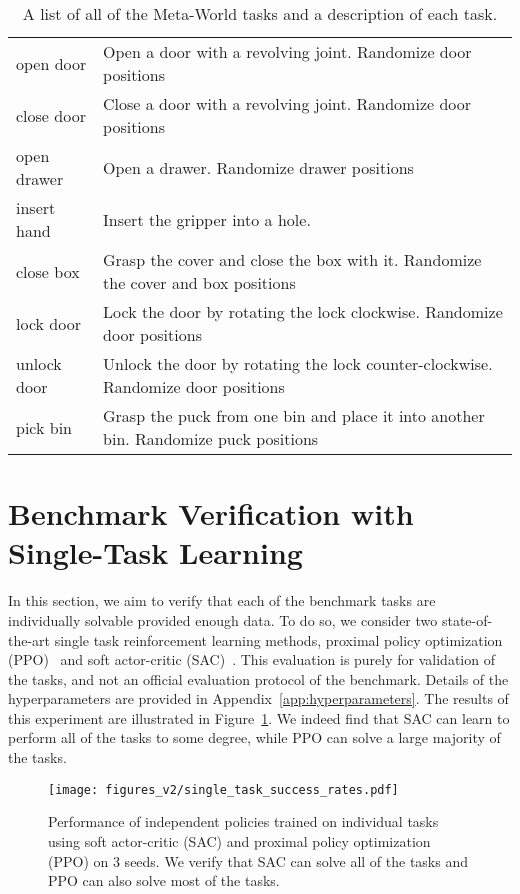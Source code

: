 \begin{table}[h]
\begin{tabular}{ll}
open door & Open a door with a revolving joint. Randomize door positions\\
close door & Close a door with a revolving joint. Randomize door positions\\
open drawer & Open a drawer. Randomize drawer positions\\
insert hand & Insert the gripper into a hole.\\
close box & Grasp the cover and close the box with it. Randomize the cover and box positions\\
lock door & Lock the door by rotating the lock clockwise. Randomize door positions\\
unlock door & Unlock the door by rotating the lock counter-clockwise. Randomize door positions\\
pick bin & Grasp the puck from one bin and place it into another bin. Randomize puck positions\\
\bottomrule
\end{tabular}
\vspace{0.2cm}
    \caption{A list of all of the Meta-World tasks and a description of each task.}
    \label{tbl:tasks}
\end{table}




\section{Benchmark Verification with Single-Task Learning}
\label{app:singletask}


In this section, we aim to verify that each of the benchmark tasks are individually solvable provided enough data. To do so, we consider two state-of-the-art single task reinforcement learning methods, proximal policy optimization (PPO)~\cite{schulman2017proximal} and soft actor-critic (SAC)~\cite{haarnoja2018soft}.
This evaluation is purely for validation of the tasks, and not an official evaluation protocol of the benchmark. Details of the hyperparameters are provided in Appendix~\ref{app:hyperparameters}.
The results of this experiment are illustrated in Figure~\ref{fig:single_task_results}. We indeed find that SAC can learn to perform all of the  tasks to some degree, while PPO can solve a large majority of the tasks.

\begin{figure}[t]
    \centering
    \texttt{[image: figures\_v2/single\_task\_success\_rates.pdf]}
    \vspace{-1cm}
    \caption{Performance of independent policies trained on individual tasks using soft actor-critic (SAC) and proximal policy optimization (PPO) on 3 seeds. We verify that SAC can solve all of the tasks and PPO can also solve most of the tasks.}
    \vspace{-0.5cm}
    \label{fig:single_task_results}
\end{figure}

